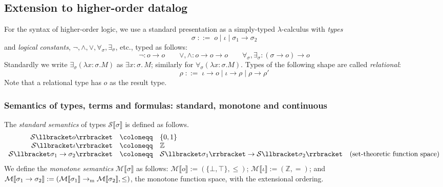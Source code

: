 
\newcommand{\abs}[2]{\lambda #1.{#2}}

\newcommand{\boolsort}{o}
\newcommand{\intsort}{\iota}
\newcommand{\mng}[1]{\llbracket #1 \rrbracket}
\newcommand{\mmng}[1]{\mathcal{M}\llbracket #1 \rrbracket}
\newcommand{\cmng}[1]{\mathcal{C}\llbracket #1 \rrbracket}
\newcommand{\smng}[1]{\mathcal{S}\llbracket #1 \rrbracket}
\newcommand\makeset[1]{\{#1\}}
\newcommand\disjointTimesS{\disjointTimes_S}
\newcommand\superposeS{{\superpose_S}}
\newcommand{\twistS}{\cplus_{\superpose_S}}
\newcommand\lub{\bigsqcup}

\subsection{Extension to higher-order datalog}

For the syntax of higher-order logic, we use a standard presentation as a simply-typed $\lambda$-calculus with \emph{types}
\[
\sigma \; ::= \; \boolsort \mid \intsort \mid \sigma_1 \to \sigma_2
\]
and \emph{logical constants}, $\neg, \wedge, \vee, \forall_\sigma, \exists_\sigma$, etc., typed as follows:
\[ \neg : \boolsort \to \boolsort \qquad \vee, \wedge : \boolsort \to \boolsort \to \boolsort \qquad \forall_\sigma, \exists_\sigma : (\sigma \to \boolsort) \to \boolsort\]
Standardly we write $\exists_\sigma(\abs{x\!\!:\!\!\sigma}{M})$ as $\exists x\!\!:\!\!\sigma .\, M$; similarly for $\forall_\sigma(\abs{x\!\!:\!\!\sigma}{M})$.
Types of the following shape are called \emph{relational}:
\[
\rho \; ::= \; \intsort \to \boolsort \mid \intsort \to \rho \mid \rho \to \rho'
\]
Note that a relational type has $\boolsort$ as the result type.

\subsubsection{Semantics of types, terms and formulas: standard, monotone and continuous}
The \emph{standard semantics} of types $\smng{\sigma}$ is defined as follows.
\[
\begin{array}{rll}
  \smng{\boolsort} & \coloneqq  & \makeset{0, 1} \\ 
  \smng{\intsort} & \coloneqq  & \mathbb{Z} \\
  \smng{\sigma_1 \to \sigma_2} & \coloneqq  & \smng{\sigma_1} \to \smng{\sigma_2} \quad \hbox{(set-theoretic function space)}
\end{array}
\]
We define the \emph{monotone semantics} $\mmng{\sigma}$ as follows: 
$\mmng{\boolsort} := (\makeset{\bot, \top}, \leq)$; $\mmng{\intsort} := (\mathbb{Z}, =)$; and $\mmng{\sigma_1 \to \sigma_2} := (\mmng{\sigma_1} \to_{\rm m} \mmng{\sigma_2}, \leq)$, the monotone function space, with the extensional ordering.

